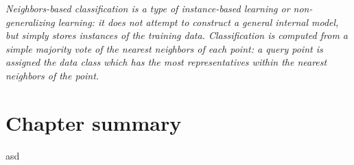 \textit{Neighbors-based classification is a type of instance-based learning or non-generalizing learning: it does not attempt to construct a general internal model, but simply stores instances of the training data. Classification is computed from a simple majority vote of the nearest neighbors of each point: a query point is assigned the data class which has the most representatives within the nearest neighbors of the point.}

\section{Chapter summary} \label{sec:ml_workflow_summary}
asd